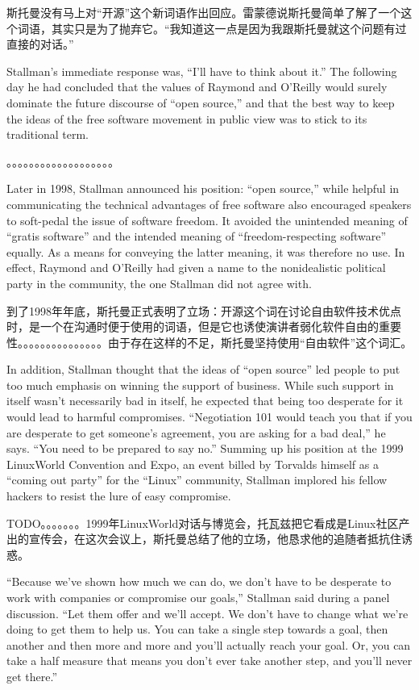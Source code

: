 \ifdefined\chs
斯托曼没有马上对``开源''这个新词语作出回应。雷蒙德说斯托曼简单了解了一个这个词语，其实只是为了抛弃它。``我知道这一点是因为我跟斯托曼就这个问题有过直接的对话。''
\fi

\ifdefined\eng
Stallman's immediate response was, ``I'll have to think about it.''  The following day he had concluded that the values of Raymond and O'Reilly would surely dominate the future discourse of ``open source,'' and that the best way to keep the ideas of the free software movement in public view was to stick to its traditional term.
\fi

\ifdefined\chs
。。。。。。。。。。。。。。。。。。。
\fi

\ifdefined\eng
Later in 1998, Stallman announced his position: ``open source,'' while helpful in communicating the technical advantages of free software also encouraged speakers to soft-pedal the issue of software freedom. It avoided the unintended meaning of ``gratis software'' and the intended meaning of ``freedom-respecting software'' equally.  As a means for conveying the latter meaning, it was therefore no use.  In effect, Raymond and O'Reilly had given a name to the nonidealistic political party in the community, the one Stallman did not agree with.
\fi

\ifdefined\chs
到了1998年年底，斯托曼正式表明了立场：开源这个词在讨论自由软件技术优点时，是一个在沟通时便于使用的词语，但是它也诱使演讲者弱化软件自由的重要性。。。。。。。。。。。。。。。由于存在这样的不足，斯托曼坚持使用``自由软件''这个词汇。
\fi

\ifdefined\eng
In addition, Stallman thought that the ideas of ``open source'' led people to put too much emphasis on winning the support of business.  While such support in itself wasn't necessarily bad in itself, he expected that being too desperate for it would lead to harmful compromises.  ``Negotiation 101 would teach you that if you are desperate to get someone's agreement, you are asking for a bad deal,'' he says.  ``You need to be prepared to say no.''  Summing up his position at the 1999 LinuxWorld Convention and Expo, an event billed by Torvalds himself as a ``coming out party'' for the ``Linux'' community, Stallman implored his fellow hackers to resist the lure of easy compromise.
\fi

\ifdefined\chs
TODO。。。。。。。1999年LinuxWorld对话与博览会，托瓦兹把它看成是Linux社区产出的宣传会，在这次会议上，斯托曼总结了他的立场，他恳求他的追随者抵抗住诱惑。
\fi

\ifdefined\eng
``Because we've shown how much we can do, we don't have to be desperate to work with companies or compromise our goals,'' Stallman said during a panel discussion. ``Let them offer and we'll accept. We don't have to change what we're doing to get them to help us. You can take a single step towards a goal, then another and then more and more and you'll actually reach your goal. Or, you can take a half measure that means you don't ever take another step, and you'll never get there.''
\fi

